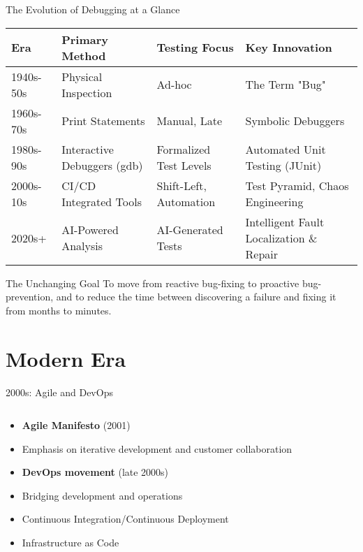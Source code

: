 \documentclass{beamer}
\begin{document}
\begin{frame}{The Evolution of Debugging at a Glance}
\begin{center}
    \begin{tabular}{|l|l|l|l|}
    \hline
    \textbf{Era} & \textbf{Primary Method} & \textbf{Testing Focus} & \textbf{Key Innovation} \\
    \hline
    1940s-50s   & Physical Inspection & Ad-hoc & The Term "Bug" \\
    \hline
    1960s-70s   & Print Statements & Manual, Late & Symbolic Debuggers \\
    \hline
    1980s-90s   & Interactive Debuggers (gdb) & Formalized Test Levels & Automated Unit Testing (JUnit) \\
    \hline
    2000s-10s   & CI/CD Integrated Tools & Shift-Left, Automation & Test Pyramid, Chaos Engineering \\
    \hline
    2020s+      & AI-Powered Analysis & AI-Generated Tests & Intelligent Fault Localization \& Repair \\
    \hline
    \end{tabular}
\end{center}
\vspace{1em}
\begin{block}{The Unchanging Goal}
To move from \alert{reactive} bug-fixing to \alert{proactive} bug-prevention, and to reduce the time between discovering a failure and fixing it from months to minutes.
\end{block}
\end{frame}
\section{Modern Era}

\begin{frame}{2000s: Agile and DevOps}
\begin{columns}
    \begin{column}{0.6\textwidth}
        \begin{itemize}
            \item \textbf{Agile Manifesto} (2001)
            \item Emphasis on iterative development and customer collaboration
            \item \textbf{DevOps movement} (late 2000s)
            \item Bridging development and operations
            \item Continuous Integration/Continuous Deployment
            \item Infrastructure as Code
        \end{itemize}
    \end{column}
    \begin{column}{0.4\textwidth}
    \end{column}
\end{columns}
\end{frame}
\end{document}
